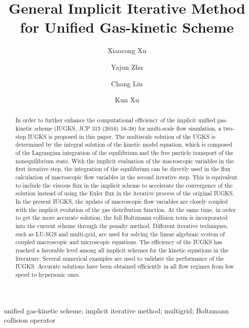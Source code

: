 \documentclass[3p,12pt]{elsarticle}
\begin{document}
	\title{General Implicit Iterative Method for Unified Gas-kinetic Scheme}
	\author[ad1]{Xiaocong Xu}
	\author[ad1]{Yajun Zhu}
	\author[ad2]{Chang Liu}
	\author[ad1,ad3]{Kun Xu}
	\address[ad1]{Department of Mathematics, The Hong Kong University of Science and Technology, Hong Kong, China}
	\address[ad2]{Institute of Applied Physics and Computational Mathematics, No. 2, FengHao East Road, HaiDian District, Beijing 100094, China}
	\address[ad3]{HKUST Shenzhen Research Institute, Shenzhen 518057, China}
	
	\begin{abstract} 	 			
In order to further enhance the computational efficiency of the implicit unified gas-kinetic scheme (IUGKS, JCP 315 (2016) 16-38) for multi-scale flow simulation, a two-step IUGKS is proposed in this paper. The multiscale solution of the UGKS is determined by the integral solution of the kinetic model equation, which is composed of the Lagrangian integration of the equilibrium and the free particle transport of the nonequilibrium state. With the implicit evaluation of the macroscopic variables in the first iterative step, the integration of the equilibrium can be directly used in the flux calculation of macroscopic flow variables in the second iterative step. This is equivalent to include the viscous flux in the implicit scheme to accelerate the convergence of the solution instead of using the Euler flux in the iterative process of the original IUGKS. In the present IUGKS, the update of macroscopic flow variables are closely coupled with the implicit evolution of the gas distribution function.
At the same time, in order to get the more accurate solution, the full Boltzmann collision term is incorporated into the current scheme through the penalty method. Different iterative techniques, such as LU-SGS and multi-grid, are used for solving the linear algebraic system of coupled macroscopic and microscopic equations. The efficiency of the IUGKS has reached a favorable level among all implicit schemes for the kinetic equations in the literature. 
Several numerical examples are used to validate the performance of the IUGKS. Accurate solutions have been obtained efficiently in all flow regimes from low speed to hypersonic ones.
	\end{abstract}
	\begin{keyword}
		unified gas-kinetic scheme; implicit iterative method; multigrid; Boltzmann collision operator
	\end{keyword}
	\maketitle
	
\end{document}

